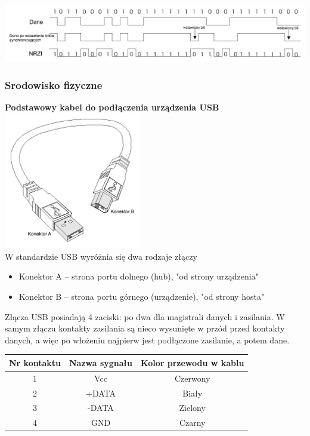			\includegraphics[width=15cm]{./wyklady/USB_9_1.pdf}
		\subsubsection{Srodowisko fizyczne}
			\textbf{Podstawowy kabel do podłączenia urządzenia USB}\\
			\includegraphics[width=6cm]{./wyklady/USB_10_1.pdf}\\
			W standardzie USB wyróżnia się dwa rodzaje złączy
			\begin{itemize}
				\item Konektor A – strona portu dolnego (hub), "od strony urządzenia"
				\item Konektor B – strona portu górnego (urządzenie), "od strony hosta"
			\end{itemize}
			Złącza USB posiadają 4 zaciski: po dwa dla magistrali danych i zasilania. W samym złączu kontakty zasilania są nieco wysunięte w przód przed kontakty danych, a więc po włożeniu najpierw jest podłączone zasilanie, a potem dane.
			\begin{table}[H]	%
				\begin{tabular}{|c|c|c|}
					\hline
					\textbf{Nr kontaktu}	& \textbf{Nazwa sygnału}	& \textbf{Kolor przewodu w kablu} \\ \hline
					1 						& Vcc						& Czerwony		\\ \hline
					2 						& +DATA						& Biały			\\ \hline
					3 						& -DATA						& Zielony		\\ \hline
					4 						& GND						& Czarny		\\ \hline
				\end{tabular}
			\end{table}
